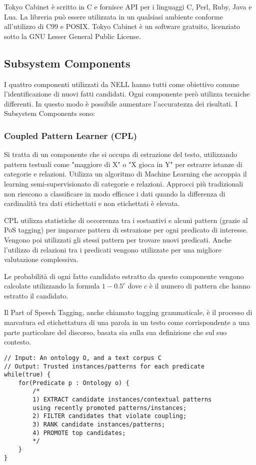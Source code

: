 \noindent Tokyo Cabinet è scritto in C e fornisce API per i linguaggi C, Perl, Ruby, Java e Lua.
La libreria può essere utilizzata in un qualsiasi ambiente conforme all'utilizzo di C99 e POSIX. Tokyo Cabinet è un software gratuito, licenziato sotto la GNU Lesser General Public License\cite{TokyoCab61:online}.
\subsection{Subsystem Components}
I quattro componenti utilizzati da NELL hanno tutti come obiettivo comune l'identificazione di nuovi fatti candidati. Ogni componente però utilizza tecniche differenti. In questo modo è possibile aumentare l'accuratezza dei risultati. I Subsystem Components sono:
\subsubsection{Coupled Pattern Learner (CPL)}
Si tratta di un componente che si occupa di estrazione del testo, utilizzando pattern testuali come "maggiore di X" o "X gioca in Y" per estrarre istanze di categorie e relazioni. Utilizza un algoritmo di Machine Learning che accoppia il learning semi-supervisionato di categorie e relazioni. Approcci più tradizionali non riescono a classificare in modo efficace i dati quando la differenza di cardinalità tra dati etichettati e non etichettati è elevata.

\noindent CPL utilizza statistiche di occorrenza tra i sostantivi e alcuni pattern (grazie al PoS tagging) per imparare pattern di estrazione per ogni predicato di interesse. Vengono poi utilizzati gli stessi pattern per trovare nuovi predicati.
Anche l'utilizzo di relazioni tra i predicati vengono utilizzate per una migliore valutazione complessiva.

\noindent Le probabilità di ogni fatto candidato estratto da questo componente vengono calcolate utilizzando la formula $1 - 0.5^{c}$ dove $c$ è il numero di pattern che hanno estratto il candidato\cite{TowardAnArchitecture:online}.
\begin{info}
	Il Part of Speech Tagging, anche chiamato tagging grammaticale, è il processo di marcatura ed etichettatura di una parola in un testo come corrispondente a una parte particolare del discorso, basata sia sulla sua definizione che sul suo contesto\cite{POStagsa85:online}.
\end{info}

\begin{code}
\begin{verbatim}
// Input: An ontology O, and a text corpus C 
// Output: Trusted instances/patterns for each predicate
while(true) {
	for(Predicate p : Ontology o) {
		/*
		1) EXTRACT candidate instances/contextual patterns 
		using recently promoted patterns/instances;
		2) FILTER candidates that violate coupling;
		3) RANK candidate instances/patterns;
		4) PROMOTE top candidates;
		*/
	}
}
\end{verbatim}
\end{code}


